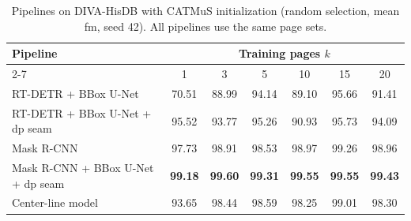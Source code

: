 \begin{table}[htbp]
    \centering
    \small
    \caption{Pipelines on DIVA-HisDB with CATMuS initialization (random selection, mean \gls{fm}, seed 42). All pipelines use the same page sets.}
    \label{tab:rq2-pipelines-catmus}\label{tab:rq2-crop-dp}
    \setlength{\tabcolsep}{4pt}
    \begin{tabular}{@{}lcccccc@{}}
        \toprule
        Pipeline & \multicolumn{6}{c}{Training pages \(k\)} \\
        \cmidrule(l){2-7}
         & 1 & 3 & 5 & 10 & 15 & 20 \\
        \midrule
        RT-DETR + BBox U-Net & 70.51 & 88.99 & 94.14 & 89.10 & 95.66 & 91.41 \\
        RT-DETR + BBox U-Net + \gls{dp} seam & 95.52 & 93.77 & 95.26 & 90.93 & 95.73 & 94.09 \\
        Mask R-CNN & 97.73 & 98.91 & 98.53 & 98.97 & 99.26 & 98.96 \\
        Mask R-CNN + BBox U-Net + \gls{dp} seam & \textbf{99.18} & \textbf{99.60} & \textbf{99.31} & \textbf{99.55} & \textbf{99.55} & \textbf{99.43} \\
        Center-line model & 93.65 & 98.44 & 98.59 & 98.25 & 99.01 & 98.30 \\
        \bottomrule
    \end{tabular}
\end{table}


